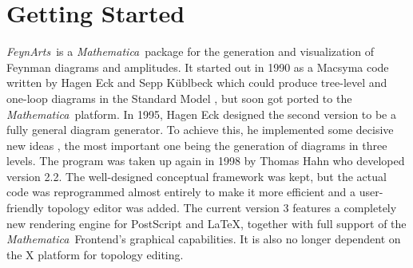 \documentclass[twoside,12pt]{article}
\def\FA{\textit{FeynArts}}
\def\mma{{\it Mathematica}}
\begin{document}
\clearpage

\tableofcontents

\clearpage

\section{Getting Started}
\label{sect:install}

\FA\ is a \mma\ package for the generation and visualization of Feynman
diagrams and amplitudes.  It started out in 1990 as a Macsyma code written
by Hagen Eck and Sepp K\"ublbeck which could produce tree-level and
one-loop diagrams in the Standard Model \cite{KuBD90}, but soon got ported
to the \mma\ platform.  In 1995, Hagen Eck designed the second version to
be a fully general diagram generator.  To achieve this, he implemented 
some decisive new ideas \cite{Eck95}, the most important one being the
generation of diagrams in three levels.  The program was taken up again in
1998 by Thomas Hahn who developed version 2.2.  The well-designed
conceptual framework was kept, but the actual code was reprogrammed almost
entirely to make it more efficient and a user-friendly topology editor was
added.  The current version 3 features a completely new rendering engine
for PostScript and \LaTeX, together with full support of the \mma\
Frontend's graphical capabilities.  It is also no longer dependent on the
X platform for topology editing.
\end{document}
